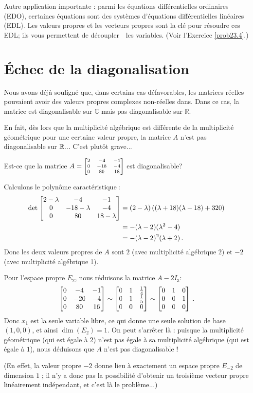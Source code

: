 Autre application importante : parmi les équations différentielles ordinaires (EDO), certaines équations sont des systèmes d'équations différentielles linéaires (EDL). Les valeurs propres et les vecteurs propres
sont la clé pour résoudre ces EDL; ils vous permettent de \og découpler\ \fg\ les variables.
 (Voir l'Exercice \ref{prob23.4}.)   


\section{Échec de la diagonalisation}

Nous avons déjà souligné que, dans certains cas défavorables, les matrices réelles pouvaient avoir des valeurs propres complexes non-réelles dans. Dans ce cas, la matrice est diagonalisable sur
$\mathbb{C}$ mais pas diagonalisable sur $\mathbb{R}$.

En fait, dès lors que la multiplicité algébrique est différente de la multiplicité géométrique pour une certaine valeur propre, la matrice $A$ n'est pas diagonalisable sur $\mathbb{R}$... C'est plutôt grave...

\begin{myexample} Est-ce que la matrice $A = \scriptsize\left[ \begin{matrix} 2& - 4& -1 \\ 0 & -18 & -4 \\ 0 & 80 & 18 \end{matrix} \right]$
est diagonalisable?

Calculons le polynôme caractéristique :
\begin{align*}
\det\left[ \begin{matrix} 2-\lambda & -4 & -1\\ 0 & -18-\lambda  & -4\\ 0 & 80 & 18-\lambda \end{matrix} \right]
&= (2-\lambda ) \left( (\lambda + 18)(\lambda - 18) +320\right) \\
&= -(\lambda - 2)(\lambda^2 -4)\\
&= -(\lambda - 2)^2(\lambda + 2)\,.
\end{align*}
Donc les deux valeurs propres de $A$ sont $2$ (avec multiplicité algébrique 2)
et $-2$ (avec multiplicité algébrique 1).

Pour l'espace propre $E_2$, nous réduisons la matrice $A-2I_3$:
$$
\left[ \begin{matrix} 0 & -4 & -1\\ 0 & -20 & -4\\ 0 & 80 & 16 \end{matrix} \right]
\sim 
\left[ \begin{matrix} 0 & 1 & \frac14\\ 0 & 1 & \frac15 \\ 0 & 0 & 0 \end{matrix} \right]
\sim
\left[ \begin{matrix} 0 & 1 & 0 \\ 0 & 0 & 1\\ 0& 0 &0 \end{matrix} \right]\,.
$$
Donc $x_1$ est la seule variable libre, ce qui donne une seule solution de base 
 $(1,0,0)$, et ainsi $\dim(E_2) = 1$.  On peut s'arrêter là : puisque la multiplicité géométrique
 (qui est égale à $2$) n'est pas égale à sa multiplicité algébrique (qui est égale à $1$),
nous déduisons que $A$ n'est pas diagonalisable !

(En effet, la valeur propre $-2$ donne lieu à
exactement un espace propre $E_{-2}$ de dimension $1$ ; il n'y a donc pas la possibilit\'e d'obtenir un troisième vecteur propre linéairement indépendant, et c'est là le problème...)
\end{myexample}


